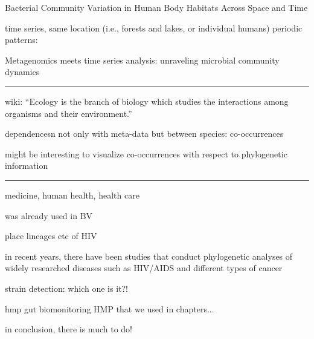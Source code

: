 Bacterial Community Variation in Human Body Habitats Across Space and Time \cite{Costello2009}

time series, same location (i.e., forests and lakes, or individual humans)
periodic patterns:

Metagenomics meets time series analysis: unraveling microbial community dynamics \cite{Faust2015}


\noindent\rule{\textwidth}{0.4pt}

wiki:
``Ecology is the branch of biology which studies the interactions among organisms and their environment.''

dependencesn not only with meta-data but between species: co-occurrences

\cite{Lima-Mendez2015,Villalobos2017,Zelezniak2015}

might be interesting to visualize co-occurrences with respect to phylogenetic information



\noindent\rule{\textwidth}{0.4pt}

medicine, human health, health care

was already used in BV

place lineages etc of HIV

in recent years, there have been studies that conduct
phylogenetic analyses of widely researched diseases such as HIV/AIDS \cite{Castro-Nallar2012,Brenner2013}
and different types of cancer \cite{Brown2017a,Abbosh2017}

strain detection: which one is it?!

hmp gut biomonitoring
\acf{HMP} \citep{Huttenhower2012,Methe2012}
that we used in chapters...

in conclusion, there is much to do!
